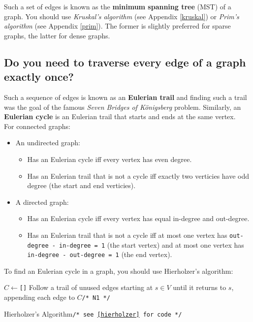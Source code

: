 \documentclass[12pt, titlepage]{article}
\begin{document}
Such a set of edges is known as the \textbf{minimum spanning tree} (MST) of a graph. You should use \textit{Kruskal's algorithm} (see Appendix \ref{kruskal}) or \textit{Prim's algorithm} (see Appendix \ref{prim}). The former is slightly preferred for sparse graphs, the latter for dense graphs.

\subsection{Do you need to traverse every edge of a graph exactly once?}

Such a sequence of edges is known as an \textbf{Eulerian trail} and finding such a trail was the goal of the famous \textit{Seven Bridges of K\"onigsberg} problem. Similarly, an \textbf{Eulerian cycle} is an Eulerian trail that starts and ends at the same vertex. \\

For connected graphs:
\begin{itemize}
  \item An undirected graph:
  \begin{itemize}
    \item Has an Eulerian cycle iff every vertex has even degree.
    \item Has an Eulerian trail that is not a cycle iff exactly two verticies have odd degree (the start and end verticies).
  \end{itemize}
  \item A directed graph:
  \begin{itemize}
    \item Has an Eulerian cycle iff every vertex has equal in-degree and out-degree.
    \item Has an Eulerian trail that is not a cycle iff at most one vertex has \texttt{out-degree - in-degree = 1} (the start vertex) and at most one vertex has \texttt{in-degree - out-degree = 1} (the end vertex). \medskip
  \end{itemize}
\end{itemize}

To find an Eulerian cycle in a graph, you should use Hierholzer's algorithm: \medskip

\begin{algorithm}[H]
  \SetAlgoLined
  \DontPrintSemicolon
  $C \longleftarrow$\hspace{0.5mm}\texttt{[]}\;
  Follow a trail of unused edges starting at $s \in V$ until it returns to $s$, appending each edge to $C$\hspace{58mm}\texttt{/* N1 */}\;
  \;
  \caption{Hierholzer's Algorithm\hspace{5mm}\texttt{/* see \ref{hierholzer} for code */}}
\end{algorithm} \medskip
\end{document}
